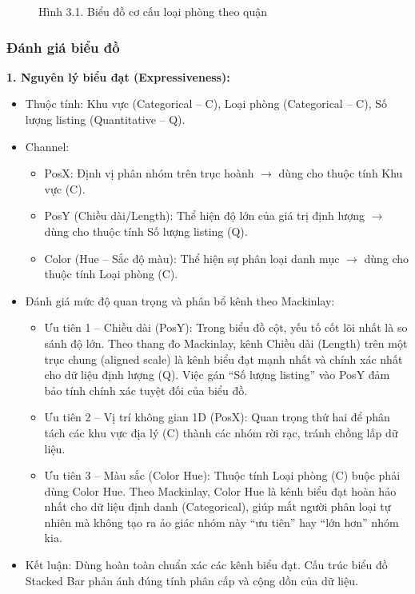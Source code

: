 \begin{figure}[H]
    \centering
    \caption{Hình 3.1. Biểu đồ cơ cấu loại phòng theo quận}
    \label{fig:domain-task3-chart1}
\end{figure}

\subsubsection{Đánh giá biểu đồ}

\textbf{1. Nguyên lý biểu đạt (Expressiveness):}

\begin{itemize}
    \item Thuộc tính: Khu vực (Categorical -- C), Loại phòng (Categorical -- C), Số lượng listing (Quantitative -- Q).
    \item Channel:
    \begin{itemize}
        \item PosX: Định vị phân nhóm trên trục hoành $\rightarrow$ dùng cho thuộc tính Khu vực (C).
        \item PosY (Chiều dài/Length): Thể hiện độ lớn của giá trị định lượng $\rightarrow$ dùng cho thuộc tính Số lượng listing (Q).
        \item Color (Hue -- Sắc độ màu): Thể hiện sự phân loại danh mục $\rightarrow$ dùng cho thuộc tính Loại phòng (C).
    \end{itemize}
    \item Đánh giá mức độ quan trọng và phân bổ kênh theo Mackinlay:
    \begin{itemize}
        \item Ưu tiên 1 -- Chiều dài (PosY): Trong biểu đồ cột, yếu tố cốt lõi nhất là so sánh độ lớn. Theo thang đo Mackinlay, kênh Chiều dài (Length) trên một trục chung (aligned scale) là kênh biểu đạt mạnh nhất và chính xác nhất cho dữ liệu định lượng (Q). Việc gán ``Số lượng listing'' vào PosY đảm bảo tính chính xác tuyệt đối của biểu đồ.
        \item Ưu tiên 2 -- Vị trí không gian 1D (PosX): Quan trọng thứ hai để phân tách các khu vực địa lý (C) thành các nhóm rời rạc, tránh chồng lấp dữ liệu.
        \item Ưu tiên 3 -- Màu sắc (Color Hue): Thuộc tính Loại phòng (C) buộc phải dùng Color Hue. Theo Mackinlay, Color Hue là kênh biểu đạt hoàn hảo nhất cho dữ liệu định danh (Categorical), giúp mắt người phân loại tự nhiên mà không tạo ra ảo giác nhóm này ``ưu tiên'' hay ``lớn hơn'' nhóm kia.
    \end{itemize}
    \item Kết luận: Dùng hoàn toàn chuẩn xác các kênh biểu đạt. Cấu trúc biểu đồ Stacked Bar phản ánh đúng tính phân cấp và cộng dồn của dữ liệu.
\end{itemize}

